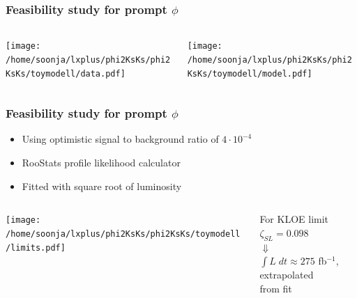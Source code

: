 \documentclass{beamer}
\begin{document}
\begin{frame}[fragile]
\frametitle{Feasibility study for prompt $\phi$}

\begin{columns}
\begin{column}{.5\textwidth}
\texttt{[image: /home/soonja/lxplus/phi2KsKs/phi2KsKs/toymodell/data.pdf]}
\end{column}

\begin{column}{.5\textwidth}
\texttt{[image: /home/soonja/lxplus/phi2KsKs/phi2KsKs/toymodell/model.pdf]}
\end{column}
\end{columns}

\end{frame}

\begin{frame}
\frametitle{Feasibility study for prompt $\phi$}
\begin{itemize}
\item Using optimistic signal to background ratio of $4\cdot 10^{-4}$
\item RooStats profile likelihood calculator
\item Fitted with square root of luminosity
\end{itemize}

\begin{columns}
\begin{column}{.7\columnwidth}
\vspace*{-.3cm}
\begin{center}
\texttt{[image: /home/soonja/lxplus/phi2KsKs/phi2KsKs/toymodell/limits.pdf]}

\end{center}
\end{column}
\begin{column}{.29\columnwidth}\centering
For KLOE limit $\zeta_{SL} = 0.098$\\
$\Downarrow$\\
$\int L \;dt \approx 275$ fb$^{-1}$,
extrapolated\\ from fit
\end{column}
\end{columns}
\end{frame}
\end{document}
